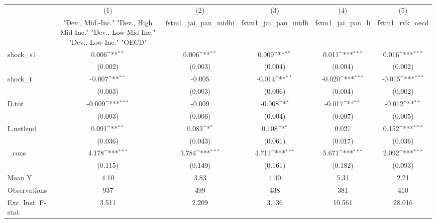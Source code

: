 {
\def\sym#1{\ifmmode^{#1}\else\(^{#1}\)\fi}
\begin{tabular}{l*{5}{c}}
\toprule
            &\multicolumn{1}{c}{(1)}&\multicolumn{1}{c}{(2)}&\multicolumn{1}{c}{(3)}&\multicolumn{1}{c}{(4)}&\multicolumn{1}{c}{(5)}\\
            &\multicolumn{1}{c}{ "Dev., Mid.-Inc." "Dev., High Mid-Inc." "Dev., Low Mid-Inc." "Dev., Low-Inc." "OECD" }&\multicolumn{1}{c}{fstm1\_jai\_pan\_midhi}&\multicolumn{1}{c}{fstm1\_jai\_pan\_midli}&\multicolumn{1}{c}{fstm1\_jai\_pan\_li}&\multicolumn{1}{c}{fstm1\_rvk\_oecd}\\
\midrule
shock\_s1    &       0.006\sym{**} &       0.006\sym{**} &       0.009\sym{**} &       0.011\sym{***}&       0.016\sym{***}\\
            &     (0.002)         &     (0.003)         &     (0.004)         &     (0.004)         &     (0.002)         \\
\addlinespace
shock\_t     &      -0.007\sym{**} &      -0.005         &      -0.014\sym{**} &      -0.020\sym{***}&      -0.015\sym{***}\\
            &     (0.003)         &     (0.003)         &     (0.006)         &     (0.004)         &     (0.002)         \\
\addlinespace
D.tot       &      -0.009\sym{***}&      -0.009         &      -0.008\sym{*}  &      -0.017\sym{**} &      -0.012\sym{**} \\
            &     (0.003)         &     (0.006)         &     (0.004)         &     (0.007)         &     (0.005)         \\
\addlinespace
L.netlend   &       0.091\sym{**} &       0.083\sym{*}  &       0.108\sym{*}  &       0.027         &       0.152\sym{***}\\
            &     (0.036)         &     (0.043)         &     (0.061)         &     (0.017)         &     (0.036)         \\
\addlinespace
\_cons      &       4.178\sym{***}&       3.784\sym{***}&       4.711\sym{***}&       5.671\sym{***}&       2.092\sym{***}\\
            &     (0.115)         &     (0.149)         &     (0.161)         &     (0.182)         &     (0.093)         \\
\midrule
Mean Y      &        4.10         &        3.83         &        4.40         &        5.31         &        2.21         \\
Observations&         937         &         499         &         438         &         381         &         410         \\
Exc. Inst. F-stat&       3.511         &       2.209         &       3.136         &      10.561         &      28.016         \\
\bottomrule
\end{tabular}
}
